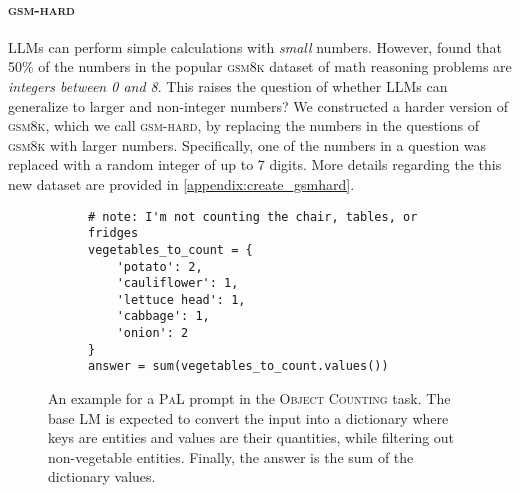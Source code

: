 \documentclass[dvipsnames]{article} \usepackage[accepted]{icml2022}
\newcommand{\ours}{\textsc{PaL}\xspace}
\newcommand{\llms}{LLMs\xspace}
\newcommand{\gsm}{\textsc{gsm8k}\xspace}
\newcommand{\gsmhard}{\textsc{gsm-hard}\xspace}
\newcommand{\objectcounting}{\textsc{Object Counting}\xspace}
\begin{document}
 
 









\paragraph{\gsmhard}
\label{sec:gsm-hard}
\llms can perform simple calculations with \emph{small} numbers. However, \citet{cotanalysis2022} found that 50\% of the numbers  in the popular \gsm dataset of math reasoning problems are \emph{integers between 0 and 8}. This raises the question of whether \llms can generalize to larger and non-integer numbers?
We constructed a harder version of \gsm, which we call \gsmhard, by replacing the numbers in the questions of \gsm with larger numbers.
Specifically, one of the numbers in a question was replaced with a random integer of up to 7 digits.
More details regarding the this new dataset are provided in \ref{appendix:create_gsmhard}.












 
\begin{figure*}[t!]
\centering
{}


\begin{subfigure}[t]{.5\textwidth}
 \begin{verbatim}
# note: I'm not counting the chair, tables, or fridges
vegetables_to_count = {
    'potato': 2,
    'cauliflower': 1,
    'lettuce head': 1,
    'cabbage': 1,
    'onion': 2
}
answer = sum(vegetables_to_count.values())
\end{verbatim}
\label{fig:objectcounting:ours}
\end{subfigure}
\caption{An example for a \ours prompt in the \objectcounting task. The base LM is expected to convert the input into a dictionary where keys are entities and values are their quantities, while filtering out non-vegetable entities. Finally, the answer is the sum of the dictionary values.}
\label{fig:objectcounting}
 \end{figure*}
\end{document}
